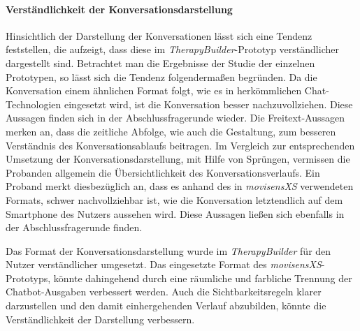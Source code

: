 \paragraph{Verständlichkeit der Konversationsdarstellung}
Hinsichtlich der Darstellung der Konversationen lässt sich eine Tendenz feststellen, die aufzeigt, dass diese im \emph{TherapyBuilder}-Prototyp verständlicher dargestellt sind. Betrachtet man die Ergebnisse der Studie der einzelnen Prototypen, so lässt sich die Tendenz folgendermaßen begründen. Da die Konversation einem ähnlichen Format folgt, wie es in herkömmlichen Chat-Technologien eingesetzt wird, ist die Konversation besser nachzuvollziehen. Diese Aussagen finden sich in der Abschlussfragerunde wieder. Die Freitext-Aussagen merken an, dass die zeitliche Abfolge, wie auch die Gestaltung, zum besseren Verständnis des Konversationsablaufs beitragen. Im Vergleich zur entsprechenden Umsetzung der Konversationsdarstellung, mit Hilfe von Sprüngen, vermissen die Probanden allgemein die Übersichtlichkeit des Konversationsverlaufs. Ein Proband merkt diesbezüglich an, dass es anhand des in \emph{movisensXS} verwendeten Formats, schwer nachvollziehbar ist, wie die Konversation letztendlich auf dem Smartphone des Nutzers aussehen wird. Diese Aussagen ließen sich ebenfalls in der Abschlussfragerunde finden. 

Das Format der Konversationsdarstellung wurde im \emph{TherapyBuilder} für den Nutzer verständlicher umgesetzt. Das eingesetzte Format des \emph{movisensXS}-Prototyps, könnte dahingehend durch eine räumliche und farbliche Trennung der Chatbot-Ausgaben verbessert werden. Auch die Sichtbarkeitsregeln klarer darzustellen und den damit einhergehenden Verlauf abzubilden, könnte die Verständlichkeit der Darstellung verbessern.

